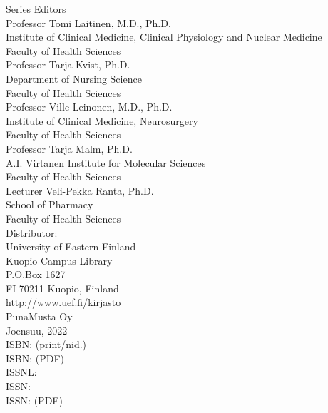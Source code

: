 \begin{center}
\vspace*{\fill}
\renewcommand{\baselinestretch}{1.4}
Series Editors \\
Professor Tomi Laitinen, M.D., Ph.D. \\
Institute of Clinical Medicine, Clinical Physiology and Nuclear Medicine \\
Faculty of Health Sciences\\[0.7cm]

Professor Tarja Kvist, Ph.D. \\
Department of Nursing Science \\
Faculty of Health Sciences \\[0.7cm]

Professor Ville Leinonen, M.D., Ph.D. \\
Institute of Clinical Medicine, Neurosurgery \\
Faculty of Health Sciences \\[0.7cm]

Professor Tarja Malm, Ph.D. \\
A.I. Virtanen Institute for Molecular Sciences \\
Faculty of Health Sciences \\[0.7cm]

Lecturer Veli-Pekka Ranta, Ph.D. \\
School of Pharmacy \\
Faculty of Health Sciences \\[0.7cm]
  
  Distributor:\\
  University of Eastern Finland\\
  Kuopio Campus Library \\
  P.O.Box 1627 \\
  FI-70211 Kuopio, Finland \\
  http://www.uef.fi/kirjasto\\[0.7cm]
  
  PunaMusta Oy \\
  Joensuu, 2022\\[1cm]
 
  ISBN:  (print/nid.)\\
  ISBN:  (PDF)\\
  ISSNL:  \\
  ISSN:   \\
  ISSN:   (PDF)
\end{center}
